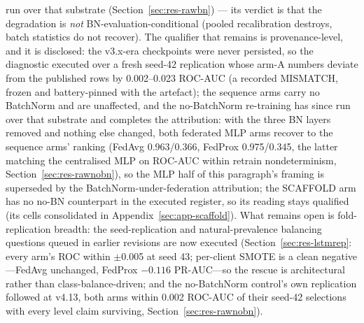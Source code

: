 run over that substrate (Section~\ref{sec:res-rawbn}) --- its verdict
is that the degradation is \emph{not} BN-evaluation-conditional (pooled
recalibration destroys, batch statistics do not recover). The
qualifier that remains is provenance-level, and it is disclosed: the
v3.x-era checkpoints were never persisted, so the diagnostic executed
over a fresh seed-42 replication whose arm-A numbers deviate from the
published rows by 0.002--0.023 ROC-AUC (a recorded MISMATCH, frozen
and battery-pinned with the artefact); the sequence arms carry no
BatchNorm and are unaffected, and the no-BatchNorm re-training has
since run over that substrate and completes the attribution: with
the three BN layers removed and nothing else changed, both federated
MLP arms recover to the sequence arms' ranking (FedAvg
0.963/0.366, FedProx 0.975/0.345, the latter matching the
centralised MLP on ROC-AUC within retrain nondeterminism,
Section~\ref{sec:res-rawnobn}), so the MLP half of
this paragraph's framing is superseded by the
BatchNorm-under-federation attribution; the SCAFFOLD arm has no
no-BN counterpart in the executed register, so its reading stays
qualified (its cells consolidated in
Appendix~\ref{sec:app-scaffold}).
What remains open is fold-replication breadth: the seed-replication
and natural-prevalence balancing questions queued in earlier
revisions are now executed (Section~\ref{sec:res-lstmrep}: every
arm's ROC within $\pm$0.005 at seed 43; per-client SMOTE is a
clean negative---FedAvg unchanged, FedProx $-0.116$ PR-AUC---so
the rescue is architectural rather than class-balance-driven; and
the no-BatchNorm control's own replication followed at v4.13, both
arms within 0.002 ROC-AUC of their seed-42 selections with every
level claim surviving, Section~\ref{sec:res-rawnobn}).

